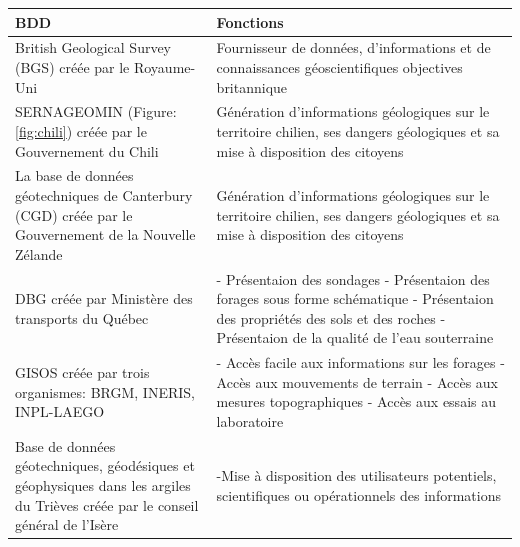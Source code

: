 \par    
\begin{table}
        \centering
        \begin{tabular}{|p{0.40\linewidth}|p{0.60\linewidth}|}
        \hline
                \textbf{BDD} & \textbf{Fonctions} \\
                \hline
                    British Geological Survey (BGS) créée par le
                    Royaume-Uni&
                    Fournisseur de données, 
                    d’informations et de connaissances 
                    géoscientifiques objectives britannique
                         \\
                \hline
                    SERNAGEOMIN (Figure:\ref{fig:chili}) créée par le
                    Gouvernement du Chili&
                    Génération 
                    d'informations géologiques sur le territoire 
                    chilien, ses dangers géologiques et sa mise 
                    à disposition des citoyens
                         \\
                \hline 
                    La base de données géotechniques de Canterbury (CGD) créée par le
                    Gouvernement de la Nouvelle Zélande&
                    Génération 
                    d'informations géologiques sur le territoire 
                    chilien, ses dangers géologiques et sa mise 
                    à disposition des citoyens
                        \\
                \hline 
                    DBG créée par
                    Ministère des transports du Québec&
                    - Présentaion des sondages
                    - Présentaion des forages sous forme schématique
                    - Présentaion des propriétés des sols et des roches
                    - Présentaion de la qualité de l’eau souterraine
                        \\
                \hline 
                GISOS créée par
                trois organismes: BRGM, INERIS, INPL-LAEGO&
                    - Accès facile aux informations sur les forages
                    - Accès aux mouvements de terrain
                    - Accès aux mesures topographiques
                    - Accès aux essais au laboratoire
                        \\
                \hline 
                Base de données géotechniques, géodésiques
                 et géophysiques dans les argiles du Trièves créée par
                 le conseil général de l'Isère&
                        -Mise à disposition des utilisateurs potentiels, scientifiques ou opérationnels des informations

\end{tabular}
\end{table}
